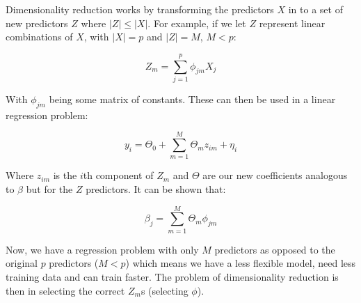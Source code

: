 Dimensionality reduction works by transforming the predictors $X$ in to a set of new predictors $Z$ where $|Z| \leq |X|$. For example, if we let $Z$ represent linear combinations of $X$, with $|X|=p$ and $|Z|=M$, $M<p$:

$$ Z_{m} = \sum^{p}_{j=1}\phi_{jm}X_{j} $$

With $\phi_{jm}$ being some matrix of constants. These can then be used in a linear regression problem:

$$ y_{i} = \Theta_{0} + \sum^{M}_{m=1}\Theta_{m}z_{im} + \eta_{i} $$

Where $z_{im}$ is the $i$th component of $Z_{m}$ and $\Theta$ are our new coefficients analogous to $\beta$ but for the $Z$ predictors. It can be shown that:

$$ \beta_{j} = \sum^{M}_{m=1}\Theta_{m}\phi_{jm} $$

Now, we have a regression problem with only $M$ predictors as opposed to the original $p$ predictors ($M<p$) which means we have a less flexible model, need less training data and can train faster. The problem of dimensionality reduction is then in selecting the correct $Z_{m}$s (selecting $\phi$).
